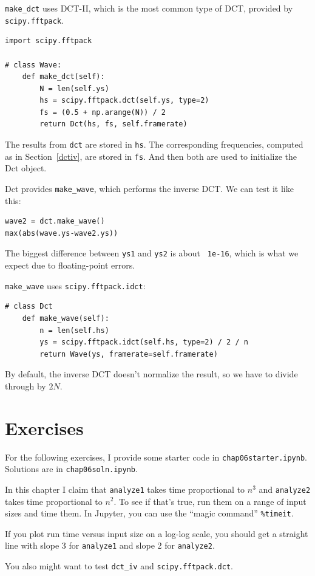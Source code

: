 \documentclass[12pt]{book}
\begin{document}
\verb"make_dct" uses DCT-II, which is the most common type of DCT,
provided by {\tt scipy.fftpack}.

\begin{verbatim}
import scipy.fftpack

# class Wave:
    def make_dct(self):
        N = len(self.ys)
        hs = scipy.fftpack.dct(self.ys, type=2)
        fs = (0.5 + np.arange(N)) / 2
        return Dct(hs, fs, self.framerate)
\end{verbatim}

The results from {\tt dct} are stored in {\tt hs}.  The corresponding
frequencies, computed as in Section~\ref{dctiv}, are stored in {\tt fs}.
And then both are used to initialize the Dct object.

Dct provides \verb"make_wave", which performs the inverse DCT.
We can test it like this:

\begin{verbatim}
wave2 = dct.make_wave()
max(abs(wave.ys-wave2.ys))
\end{verbatim}

The biggest difference between {\tt ys1} and {\tt ys2} is about {\tt
  1e-16}, which is what we expect due to floating-point errors.

\verb"make_wave" uses {\tt scipy.fftpack.idct}:

\begin{verbatim}
# class Dct
    def make_wave(self):
        n = len(self.hs)
        ys = scipy.fftpack.idct(self.hs, type=2) / 2 / n
        return Wave(ys, framerate=self.framerate)
\end{verbatim}

By default, the inverse DCT doesn't normalize the result, so we have
to divide through by $2N$.


\section{Exercises}

For the following exercises, I provide some starter code in
{\tt chap06starter.ipynb}.
Solutions are in {\tt chap06soln.ipynb}.

\begin{exercise}
In this chapter I claim that {\tt analyze1} takes time proportional
to $n^3$ and {\tt analyze2} takes time proportional to $n^2$.  To
see if that's true, run them on a range of input sizes and time
them.  In Jupyter, you can use the ``magic command'' \verb"%timeit".

If you plot run time versus input size on a log-log scale, you
should get a straight line with slope 3 for  {\tt analyze1} and
slope 2 for {\tt analyze2}.

You also might want to test \verb"dct_iv"
and {\tt scipy.fftpack.dct}.

\end{exercise}
\end{document}
